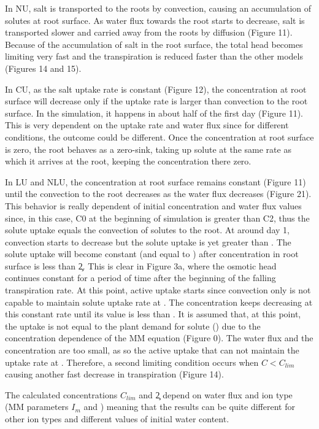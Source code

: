 In NU, salt is transported to the roots by convection, causing an accumulation of solutes at root surface. As water flux towards the root starts to decrease, salt is transported slower and carried away from the roots by diffusion (Figure 11). Because of the accumulation of salt in the root surface, the total head becomes limiting very fast and the transpiration is reduced faster than the other models (Figures 14 and 15).

In CU, as the salt uptake rate is constant (Figure 12), the concentration at root surface will decrease only if the uptake rate is larger than convection to the root surface. In the simulation, it happens in about half of the first day (Figure 11). This is very dependent on the uptake rate and water flux since for different conditions, the outcome could be different. Once the concentration at root surface is zero, the root behaves as a zero-sink, taking up solute at the same rate as which it arrives at the root, keeping the concentration there zero.

In LU and NLU, the concentration at root surface remains constant (Figure 11) until the convection to the root decreases as the water flux decreases (Figure 21). This behavior is really dependent of initial concentration and water flux values since, in this case, C0 at the beginning of simulation is greater than C2, thus the solute uptake equals the convection of solutes to the root. At around day 1, convection starts to decrease but the solute uptake is yet greater than \im . The solute uptake will become constant (and equal to \im) after concentration in root surface is less than \c2. This is clear in Figure 3a, where the osmotic head continues constant for a period of time after the beginning of the falling transpiration rate. At this point, active uptake starts since convection only is not capable to maintain solute uptake rate at \im. The concentration keeps decreasing at this constant rate until its value is less than \clim. It is assumed that, at this point, the uptake is not equal to the plant demand for solute (\im) due to the concentration dependence of the MM equation (Figure 0). The water flux and the concentration are too small, as so the active uptake that can not maintain the uptake rate at \im. Therefore, a second limiting condition occurs when $C<C_{lim}$ causing another fast decrease in transpiration (Figure 14).

The calculated concentrations $C_{lim}$ and \c2 depend on water flux and ion type (MM parameters $I_m$ and \km) meaning that the results can be quite different for other ion types and different values of initial water content.

